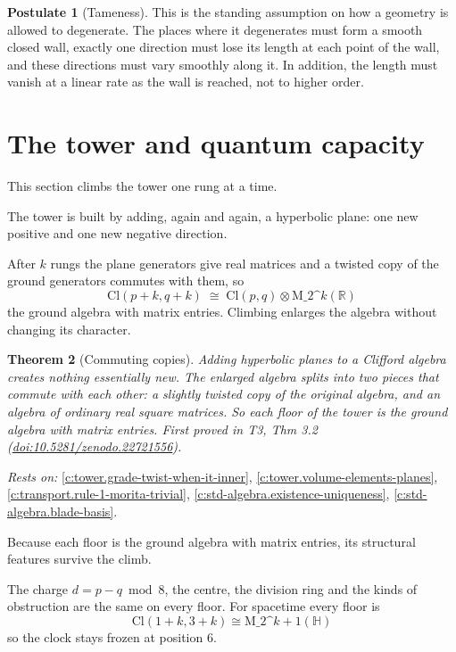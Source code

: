 \documentclass[11pt]{article}
\newtheorem{theorem}{Theorem}[section]
\theoremstyle{definition}
\newtheorem{postulate}[theorem]{Postulate}
\theoremstyle{plain}
\providecommand{\Cl}{}\renewcommand{\Cl}{\mathrm{Cl}}
\providecommand{\HH}{}\renewcommand{\HH}{\mathbb{H}}
\providecommand{\Mat}{}\renewcommand{\Mat}{\mathrm{M}}
\providecommand{\R}{}\renewcommand{\R}{\mathbb{R}}
\begin{document}
\begin{postulate}[Tameness]\label{c:sheaf.tameness}
This is the standing assumption on how a geometry is allowed to degenerate. The places where it degenerates must form a smooth closed wall, exactly one direction must lose its length at each point of the wall, and these directions must vary smoothly along it. In addition, the length must vanish at a linear rate as the wall is reached, not to higher order.
\end{postulate}

\section{The tower and quantum capacity}

This section climbs the tower one rung at a time.

The tower is built by adding, again and again, a hyperbolic plane: one new positive and one new negative direction.

After $k$ rungs the plane generators give real matrices and a twisted copy of the ground generators commutes with them, so \[ \Cl(p{+}k, q{+}k) \;\cong\; \Cl(p,q) \otimes \Mat\_{2\^{}k}(\R) \] the ground algebra with matrix entries. Climbing enlarges the algebra without changing its character.

\begin{theorem}[Commuting copies]\label{c:tower.commuting-copies}
Adding hyperbolic planes to a Clifford algebra creates nothing essentially new. The enlarged algebra splits into two pieces that commute with each other: a slightly twisted copy of the original algebra, and an algebra of ordinary real square matrices. So each floor of the tower is the ground algebra with matrix entries.
\emph{First proved in} T3, Thm 3.2 (\href{https://doi.org/10.5281/zenodo.22721556}{doi:10.5281/zenodo.22721556}).
\end{theorem}
\noindent\emph{Rests on:} \ref{c:tower.grade-twist-when-it-inner}, \ref{c:tower.volume-elements-planes}, \ref{c:transport.rule-1-morita-trivial}, \ref{c:std-algebra.existence-uniqueness}, \ref{c:std-algebra.blade-basis}.

Because each floor is the ground algebra with matrix entries, its structural features survive the climb.

The charge $d = p - q \bmod 8$, the centre, the division ring and the kinds of obstruction are the same on every floor. For spacetime every floor is \[ \Cl(1{+}k, 3{+}k) \cong \Mat\_{2\^{}{k+1}}(\HH) \] so the clock stays frozen at position $6$.
\end{document}
